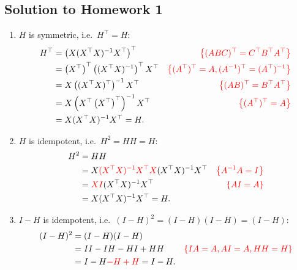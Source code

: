 \documentclass{article}
\begin{document}
  \subsection*{Solution to Homework 1}

  \begin{enumerate}
	\item $H$ is symmetric, i.e.~$H^\top = H$:
	\begin{align*}
	H^\top &= \left( X(X^\top X)^{-1}X^\top \right)^\top & {\color{red} \left\{ (ABC)^\top = C^\top B^\top A^\top \right\}}\\
	 &= \left(X^\top\right)^\top \left((X^\top X)^{-1}\right)^\top X^\top & {\color{red} \left\{ (A^\top)^\top = A, (A^{-1})^\top = (A^\top)^{-1} \right\}}\\
	 &= X \left((X^\top X)^\top\right)^{-1} X^\top & {\color{red} \left\{ (AB)^\top = B^\top A^\top \right\}}\\
	 &= X \left(X^\top \left(X^\top\right)^\top\right)^{-1} X^\top & {\color{red} \left\{ (A^\top)^\top = A \right\}}\\
	 &= X (X^\top X)^{-1} X^\top = H.
	\end{align*}
	\item $H$ is idempotent, i.e.~$H^2 = HH = H$:
	\begin{align*}
	H^2 &= HH\\
	 &= X{\color{red} (X^\top X)^{-1}X^\top X}(X^\top X)^{-1}X^\top & {\color{red} \left\{ A^{-1} A = I \right\}}\\
	 &= {\color{red} XI}(X^\top X)^{-1}X^\top & {\color{red} \left\{ AI = A \right\}}\\
	 &= X(X^\top X)^{-1}X^\top = H.
	\end{align*}
	\item $I-H$ is idempotent, i.e.~$(I-H)^2 = (I-H)(I-H) = (I-H)$:
	\begin{align*}
	(I-H)^2 &= (I-H)(I-H)\\
	 &= II - IH - HI + HH & {\color{red} \left\{ IA = A, AI = A, HH = H \right\}}\\
	 &= I - H {\color{red} - H + H} = I - H.
	\end{align*}
  \end{enumerate}
\end{document}
